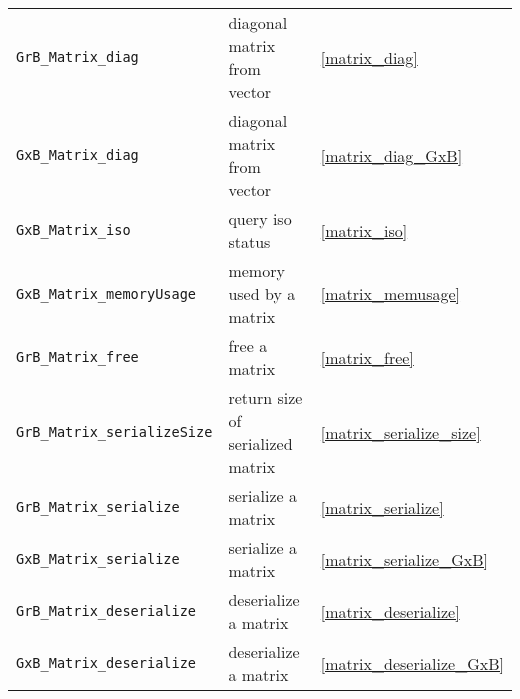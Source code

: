 \documentclass[12pt]{article}
\begin{document}
{{\begin{tabular}{lll}
\verb'GrB_Matrix_diag'          & diagonal matrix from vector           & \ref{matrix_diag} \\
\verb'GxB_Matrix_diag'          & diagonal matrix from vector           & \ref{matrix_diag_GxB} \\
\verb'GxB_Matrix_iso'           & query iso status                      & \ref{matrix_iso} \\
\verb'GxB_Matrix_memoryUsage'   & memory used by a matrix               & \ref{matrix_memusage} \\
\verb'GrB_Matrix_free'          & free a matrix                         & \ref{matrix_free} \\
\hline
\hline
\verb'GrB_Matrix_serializeSize' & return size of serialized matrix & \ref{matrix_serialize_size} \\
\verb'GrB_Matrix_serialize'     & serialize a matrix               & \ref{matrix_serialize} \\
\verb'GxB_Matrix_serialize'     & serialize a matrix               & \ref{matrix_serialize_GxB} \\
\verb'GrB_Matrix_deserialize'   & deserialize a matrix             & \ref{matrix_deserialize} \\
\verb'GxB_Matrix_deserialize'   & deserialize a matrix             & \ref{matrix_deserialize_GxB} \\
\hline
\end{tabular}
}

}
\end{document}
